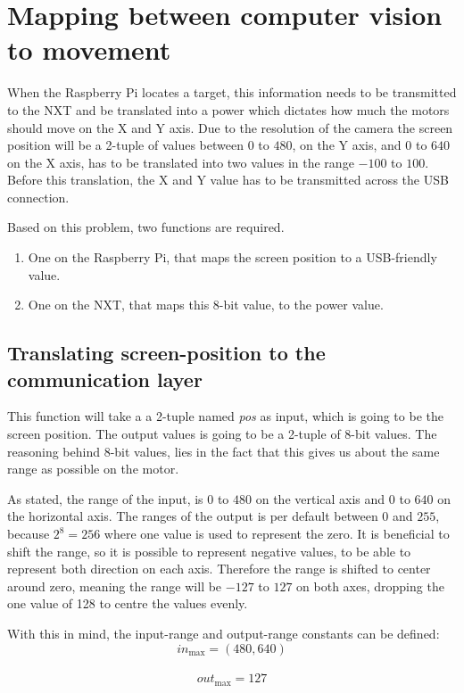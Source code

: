\section{Mapping between computer vision to movement}
When the Raspberry Pi locates a target, this information needs to be transmitted to the NXT and be translated into a power which dictates how much the motors should move on the X and Y axis.
Due to the resolution of the camera the screen position will be a 2-tuple of values between $0$ to $480$, on the Y axis, and $0$ to $640$ on the X axis, has to be translated into two values in the range $-100$ to $100$.
Before this translation, the X and Y value has to be transmitted across the USB connection.

Based on this problem, two functions are required.
\begin{enumerate}
	\item One on the Raspberry Pi, that maps the screen position to a USB-friendly value.
	\item One on the NXT, that maps this 8-bit value, to the power value.
\end{enumerate}


\subsection{Translating screen-position to the communication layer}
This function will take a a 2-tuple named \textit{pos} as input, which is going to be the screen position.
The output values is going to be a 2-tuple of 8-bit values.
The reasoning behind 8-bit values, lies in the fact that this gives us about the same range as possible on the motor.

As stated, the range of the input, is $0$ to $480$ on the vertical axis and $0$ to $640$ on the horizontal axis.
The ranges of the output is per default between $0$ and $255$, because $2^8 = 256 $ where one value is used to represent the zero.
It is beneficial to shift the range, so it is possible to represent negative values, to be able to represent both direction on each axis.
Therefore the range is shifted to center around zero, meaning the range will be $-127$ to $127$ on both axes, dropping the one value of 128 to centre the values evenly.

With this in mind, the input-range and output-range constants can be defined:\\
$$in_\text{max} = (480,640)$$\\
$$out_\text{max} = 127$$

